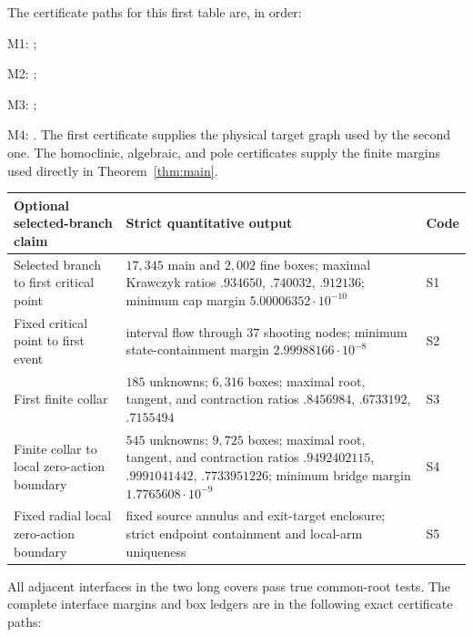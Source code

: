 \documentclass[11pt]{amsart}
\numberwithin{equation}{section}
\theoremstyle{definition}
\theoremstyle{remark}
\begin{document}
The certificate paths for this first table are, in order:

\begingroup\small
\noindent M1: ;\par
\noindent M2: ;\par
\noindent M3: ;\par
\noindent M4: .
\endgroup
The first certificate supplies the physical target graph used by the
second one.  The homoclinic, algebraic, and pole certificates supply the
finite margins used directly in Theorem~\ref{thm:main}.

\begingroup
\small
\setlength{\tabcolsep}{3pt}
\renewcommand{\arraystretch}{1.18}
\begin{center}
\begin{tabularx}{\textwidth}
 {|>{\raggedright\arraybackslash}p{}|
   Y|
   >{\centering\arraybackslash}p{.06\textwidth}|}
\hline
Optional selected-branch claim & Strict quantitative output & Code\\
\hline
Selected branch to first critical point &
$17{,}345$ main and $2{,}002$ fine boxes; maximal Krawczyk ratios
$.934650$, $.740032$, $.912136$; minimum cap margin
$5.00006352\cdot10^{-10}$ &
S1\\
\hline
Fixed critical point to first event &
interval flow through $37$ shooting nodes; minimum state-containment margin
$2.99988166\cdot10^{-8}$ &
S2\\
\hline
First finite collar &
$185$ unknowns; $6{,}316$ boxes; maximal root, tangent, and contraction ratios
$.8456984$, $.6733192$, $.7155494$ &
S3\\
\hline
Finite collar to local zero-action boundary &
$545$ unknowns; $9{,}725$ boxes; maximal root, tangent, and contraction ratios
$.9492402115$, $.9991041442$, $.7733951226$; minimum bridge margin
$1.7765608\cdot10^{-9}$ &
S4\\
\hline
Fixed radial local zero-action boundary &
fixed source annulus and exit-target enclosure; strict endpoint containment
and local-arm uniqueness &
S5\\
\hline
\end{tabularx}
\end{center}
\endgroup

All adjacent interfaces in the two long covers pass true common-root tests.
The complete interface margins and box ledgers are in the following exact
certificate paths:
\end{document}
